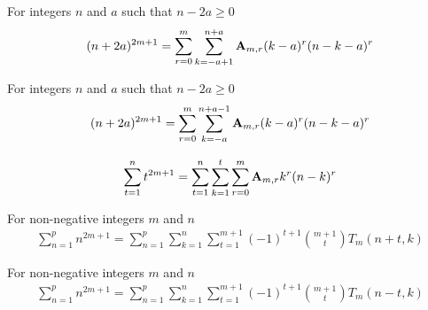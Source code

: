 \begin{corollary}
    \label{prop:odd-power-binomial-plus}
    For integers $n$ and $a$ such that $n-2a \geq 0$
    \begin{align*}
    (n+2a)^{2m+1} = \sum_{r=0}^{m} \sum_{k=-a+1}^{n+a} {\mathbf{A}} \sb{m,r} (k-a)^r (n-k-a)^r
    \end{align*}
\end{corollary}

\begin{corollary}
    \label{prop:odd-power-binomial-plus-shifted}
    For integers $n$ and $a$ such that $n-2a \geq 0$
    \begin{align*}
    (n+2a)^{2m+1} = \sum_{r=0}^{m} \sum_{k=-a}^{n+a-1} {\mathbf{A}} \sb{m,r} (k-a)^r (n-k-a)^r
    \end{align*}
\end{corollary}

\begin{proposition}
    \label{prop:sum-of-odd-powers}
    \begin{align*}
        \sum_{t=1}^{n} t^{2m+1} = \sum_{t=1}^{n} \sum_{k=1}^{t} \sum_{r=0}^{m} {\mathbf{A}} \sb{m,r} k^r (n-k)^r
    \end{align*}
\end{proposition}

\begin{proposition}
    \label{prop:sum-odd-power-decomposition-forward}
    For non-negative integers $m$ and $n$
    \begin{align*}
        \sum_{n=1}^{p} n^{2m+1} = \sum_{n=1}^{p} \sum_{k=1}^{n} \sum_{t=1}^{m+1} (-1)^{t+1} \binom{m+1}{t} T_{m} (n+t, k)
    \end{align*}
\end{proposition}

\begin{proposition}
    \label{prop:sum-odd-power-decomposition-backward}
    For non-negative integers $m$ and $n$
    \begin{align*}
        \sum_{n=1}^{p} n^{2m+1} = \sum_{n=1}^{p} \sum_{k=1}^{n} \sum_{t=1}^{m+1} (-1)^{t+1} \binom{m+1}{t} T_{m} (n-t, k)
    \end{align*}
\end{proposition}
